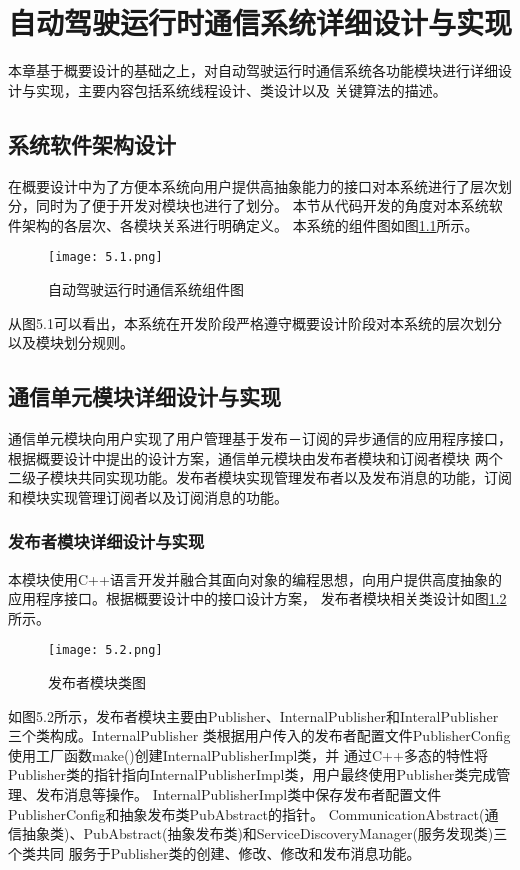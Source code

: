 \chapter{自动驾驶运行时通信系统详细设计与实现}
本章基于概要设计的基础之上，对自动驾驶运行时通信系统各功能模块进行详细设计与实现，主要内容包括系统线程设计、类设计以及
关键算法的描述。

\section{系统软件架构设计}
在概要设计中为了方便本系统向用户提供高抽象能力的接口对本系统进行了层次划分，同时为了便于开发对模块也进行了划分。
本节从代码开发的角度对本系统软件架构的各层次、各模块关系进行明确定义。
本系统的组件图如图\ref{system_component}所示。
\begin{figure}[H]
    \centering
    \texttt{[image: 5.1.png]}
    \caption{自动驾驶运行时通信系统组件图}
    \label{system_component}
  \end{figure}
从图5.1可以看出，本系统在开发阶段严格遵守概要设计阶段对本系统的层次划分以及模块划分规则。

\section{通信单元模块详细设计与实现}
通信单元模块向用户实现了用户管理基于发布－订阅的异步通信的应用程序接口，根据概要设计中提出的设计方案，通信单元模块由发布者模块和订阅者模块
两个二级子模块共同实现功能。发布者模块实现管理发布者以及发布消息的功能，订阅和模块实现管理订阅者以及订阅消息的功能。

\subsection{发布者模块详细设计与实现}
本模块使用C++语言开发并融合其面向对象的编程思想，向用户提供高度抽象的应用程序接口。根据概要设计中的接口设计方案，
发布者模块相关类设计如图\ref{publisher_class}所示。
\begin{figure}[H]
  \centering
  \texttt{[image: 5.2.png]}
  \caption{发布者模块类图}
  \label{publisher_class}
\end{figure}
如图5.2所示，发布者模块主要由Publisher、InternalPublisher和InteralPublisher三个类构成。InternalPublisher
类根据用户传入的发布者配置文件PublisherConfig使用工厂函数make()创建InternalPublisherImpl类，并
通过C++多态的特性将Publisher类的指针指向InternalPublisherImpl类，用户最终使用Publisher类完成管理、发布消息等操作。
InternalPublisherImpl类中保存发布者配置文件PublisherConfig和抽象发布类PubAbstract的指针。
CommunicationAbstract(通信抽象类)、PubAbstract(抽象发布类)和ServiceDiscoveryManager(服务发现类)三个类共同
服务于Publisher类的创建、修改、修改和发布消息功能。

